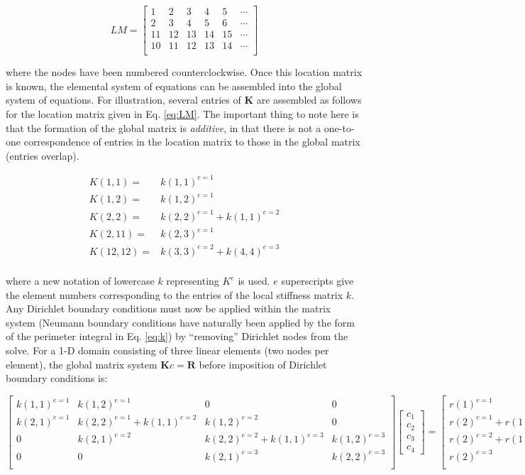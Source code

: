 \documentclass[10pt]{article}
\newcommand{\beq}{\begin{equation}}
\newcommand{\eeq}{\end{equation}}
\newcommand{\beqa}{\begin{equation}\begin{aligned}}
\newcommand{\eeqa}{\end{aligned}\end{equation}}
\begin{document}
\beq
\label{eq:LM}
LM=\begin{bmatrix}
1 & 2 & 3 & 4 & 5 & \cdots\\
2 & 3 & 4 & 5 & 6 & \cdots\\
11 & 12 & 13 & 14 & 15 & \cdots\\
10 & 11 & 12 & 13 & 14 & \cdots\\
\end{bmatrix}
\eeq

where the nodes have been numbered counterclockwise. Once this location matrix is known, the elemental system of equations can be assembled into the global system of equations. For illustration, several entries of \textbf{K} are assembled as follows for the location matrix given in Eq. \eqref{eq:LM}. The important thing to note here is that the formation of the global matrix is {\it additive}, in that there is not a one-to-one correspondence of entries in the location matrix to those in the global matrix (entries overlap). 

\beqa
K(1, 1) =& k(1, 1)^{e=1}\\
K(1, 2) =& k(1, 2)^{e=1}\\
K(2, 2) =& k(2, 2)^{e=1}+k(1, 1)^{e=2}\\
K(2, 11) =& k(2, 3)^{e=1}\\
K(12, 12) =& k(3, 3)^{e=2}+k(4, 4)^{e=3}\\
\eeqa

where a new notation of lowercase \(k\) representing \(K^e\) is used. \(e\) superscripts give the element numbers corresponding to the entries of the local stiffness matrix \(k\). Any Dirichlet boundary conditions must now be applied within the matrix system (Neumann boundary conditions have naturally been applied by the form of the perimeter integral in Eq. \eqref{eq:k}) by ``removing'' Dirichlet nodes from the solve. For a 1-D domain consisting of three linear elements (two nodes per element), the global matrix system \(\textbf{K}c=\textbf{R}\) before imposition of Dirichlet boundary conditions is:

\beq
\begin{bmatrix}
k(1, 1)^{e=1} & k(1, 2)^{e=1} & 0 & 0\\
k(2, 1)^{e=1} & k(2, 2)^{e=1}+k(1, 1)^{e=2} & k(1, 2)^{e=2} & 0\\
0 & k(2, 1)^{e=2} & k(2, 2)^{e=2}+k(1, 1)^{e=3} & k(1, 2)^{e=3}\\
0 & 0 & k(2, 1)^{e=3} & k(2, 2)^{e=3}\\
\end{bmatrix}
\begin{bmatrix}
c_1\\c_2\\c_3\\c_4
\end{bmatrix}
=\begin{bmatrix}
r(1)^{e=1} \\ r(2)^{e=1}+r(1)^{e=2}\\r(2)^{e=2}+r(1)^{e=3}\\r(2)^{e=3}\\
\end{bmatrix}
\eeq
\end{document}
